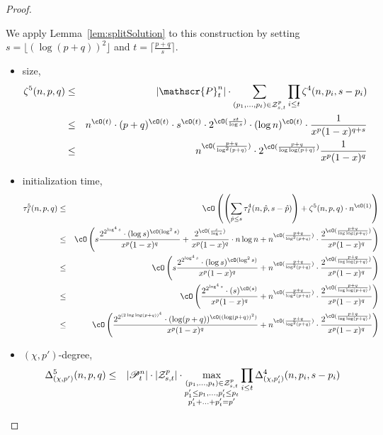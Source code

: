 \begin{proof}
\begin{itemize}
\end{itemize}
We apply Lemma~\ref{lem:splitSolution} to this construction by setting $s=\lfloor(\log (p+q))^2 \rfloor$ and 
$t = \lceil \frac{p+q}{s} \rceil$.
\begin{itemize}\item size,
\begin{eqnarray*}
\zeta^5(n,p,q) &\leq& |\mathscr{P}_t^n| \cdot 
\sum_{(p_1,\ldots,p_t) \in {\cal Z}_{s,t}^{p} } \prod_{i \leq t} \zeta^4(n,p_i,s-p_i)\\
&\leq& n^{\cO(t)}\cdot(p+q)^{\cO(t)}\cdot s^{\cO(t)} \cdot 2^{\cO(\frac{st}{\log s})}\cdot (\log n)^{\cO(t)}\cdot \frac{1}{x^p(1-x)^{q+s}}\\ 
&\leq& n^{\cO(\frac{p+q}{\log^2(p+q)})} \cdot 2^{\cO(\frac{p+q}{\log\log(p+q)})} \frac{1}{x^p(1-x)^q}
\end{eqnarray*}
\item initialization time,
\begin{eqnarray*}
\tau_I^5(n,p,q) &\leq& \cO\left(\left(\sum_{\hat{p} \leq s} \tau_I^4(n,\hat{p},s-\hat{p})\right) + \zeta^5(n,p,q) \cdot n^{\cO(1)}\right)\\
&\leq&\cO\left(s\frac{2^{2^{\log^4s}}\cdot (\log s)^{\cO(\log^2s)}}{x^p(1-x)^q}+ \frac{2^{\cO(\frac{s}{\log s})}}{x^p(1-x)^q}\cdot n\log n + n^{\cO(\frac{p+q}{\log^2(p+q)})} \cdot  \frac{2^{\cO(\frac{p+q}{\log\log(p+q)})}}{x^p(1-x)^q}
\right)\\
&\leq&\cO\left(s\frac{2^{2^{\log^4s}}\cdot (\log s)^{\cO(\log^2s)}}{x^p(1-x)^q} + n^{\cO(\frac{p+q}{\log^2(p+q)})} \cdot  \frac{2^{\cO(\frac{p+q}{\log\log(p+q)})}}{x^p(1-x)^q}
\right)\\
&\leq&\cO\left(\frac{2^{2^{\log^4s}}\cdot (s)^{\cO(s)}}{x^p(1-x)^q} + n^{\cO(\frac{p+q}{\log^2(p+q)})} \cdot  \frac{2^{\cO(\frac{p+q}{\log\log(p+q)})}}{x^p(1-x)^q}
\right)\\
&\leq&\cO\left(\frac{2^{2^{(2\log\log(p+q))^4}}\cdot (\log(p+q))^{\cO((\log(p+q))^2)}} {x^p(1-x)^q} 
+ n^{\cO(\frac{p+q}{\log^2(p+q)})} \cdot  \frac{2^{\cO(\frac{p+q}{\log\log(p+q)})}}{x^p(1-x)^q}
\right)
\end{eqnarray*}
 \item $(\chi,p')$-degree, 
\begin{eqnarray*}
\Delta_{(\chi,p')}^5(n,p,q) &\leq& |\mathscr{P}_t^n|\cdot |{\cal Z}_{s,t}^{p}| \cdot  
\max_{\substack{(p_1,\ldots,p_t) \in {\cal Z}_{s,t}^{p} \\ p_1'\leq p_1,\ldots, p_t'\leq p_t \\ p_1'+\ldots+p_t'=p' }} \prod_{i \leq t}  \Delta_{(\chi,p_i')}^4(n,p_i,s-p_i)\\

\end{eqnarray*}
\end{itemize}
\end{proof}
